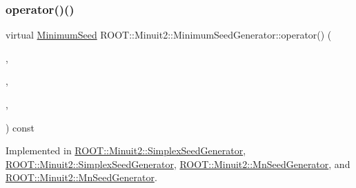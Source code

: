 \subsubsection{\texorpdfstring{operator()()}{operator()()}\hspace{0.1cm}{\footnotesize\ttfamily [2/4]}}
{\footnotesize\ttfamily virtual \mbox{\hyperlink{classROOT_1_1Minuit2_1_1MinimumSeed}{Minimum\+Seed}} R\+O\+O\+T\+::\+Minuit2\+::\+Minimum\+Seed\+Generator\+::operator() (\begin{DoxyParamCaption}\item[{const \mbox{\hyperlink{classROOT_1_1Minuit2_1_1MnFcn}{Mn\+Fcn}} \&}]{,  }\item[{const \mbox{\hyperlink{classROOT_1_1Minuit2_1_1GradientCalculator}{Gradient\+Calculator}} \&}]{,  }\item[{const \mbox{\hyperlink{classROOT_1_1Minuit2_1_1MnUserParameterState}{Mn\+User\+Parameter\+State}} \&}]{,  }\item[{const \mbox{\hyperlink{classROOT_1_1Minuit2_1_1MnStrategy}{Mn\+Strategy}} \&}]{ }\end{DoxyParamCaption}) const\hspace{0.3cm}{\ttfamily [pure virtual]}}



Implemented in \mbox{\hyperlink{classROOT_1_1Minuit2_1_1SimplexSeedGenerator_aa0c427acb85f9a47a0abaecbf85b1f5c}{R\+O\+O\+T\+::\+Minuit2\+::\+Simplex\+Seed\+Generator}}, \mbox{\hyperlink{classROOT_1_1Minuit2_1_1SimplexSeedGenerator_a48f1bb260753e6c6f053072d4754a028}{R\+O\+O\+T\+::\+Minuit2\+::\+Simplex\+Seed\+Generator}}, \mbox{\hyperlink{classROOT_1_1Minuit2_1_1MnSeedGenerator_a654d0f1b67cd1a3a17de8334ba811ef0}{R\+O\+O\+T\+::\+Minuit2\+::\+Mn\+Seed\+Generator}}, and \mbox{\hyperlink{classROOT_1_1Minuit2_1_1MnSeedGenerator_a1c06ece239f548163beb232600dc8cc3}{R\+O\+O\+T\+::\+Minuit2\+::\+Mn\+Seed\+Generator}}.

\mbox{\label{classROOT_1_1Minuit2_1_1MinimumSeedGenerator_a670b9671c73d7e0d3caa148e82d4b2fa}} 
